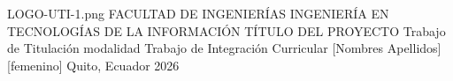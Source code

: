 \documentclass[12pt,a4paper,oneside]{report}
\begin{document}
%
%
%
%
%
%
\UTIPortada
{LOGO-UTI-1.png} %
{FACULTAD DE INGENIERÍAS} %
{INGENIERÍA EN TECNOLOGÍAS DE LA INFORMACIÓN} %
{TÍTULO DEL PROYECTO} %
{Trabajo de Titulación modalidad Trabajo de Integración Curricular} %
{[Nombres Apellidos][femenino]} %
{} %
{Quito, Ecuador} %
{2026} %
\end{document}
